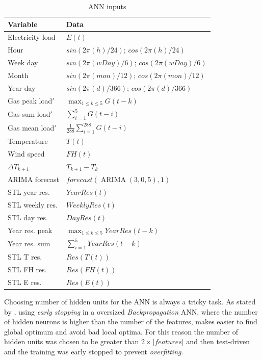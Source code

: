 \documentclass{sig-alternate-sigmod07}
\begin{document}
\begin{table}
\centering
\caption{ANN inputs}
\label{tab:ANNinputs}
\begin{tabular}{ll} \hline
Variable			& Data\\ \hline
Electricity load 		& $E(t)$ \\ 
Hour				& $sin(2\pi(h)/24)$; $cos(2\pi(h)/24)$\\
Week day			& $sin(2\pi(wDay)/6)$; $cos(2\pi(wDay)/6)$ \\
Month			& $sin(2\pi(mon)/12)$; $cos(2\pi(mon)/12)$ \\
Year day			& $sin(2\pi(d)/366)$; $cos(2\pi(d)/366)$ \\
Gas peak load$'$	& $\max_{1 \leq k \leq 5}G(t-k)$ \\
Gas sum load$'$	& $\sum_{i=1}^{5} G(t-i)$ \\
Gas mean load$'$	& $\frac{1}{288}\sum_{i=1}^{288} G(t-i)$ \\
Temperature		& $T(t)$ \\
Wind speed		& $FH(t)$ \\
$\Delta T_{k+1}$	& $T_{k+1} - T_{k}$ \\
ARIMA forecast		& $forecast(\operatorname{ARIMA} (3,0,5), 1)$ \\
STL year res.		& $YearRes(t)$ \\
STL weekly res.		& $WeeklyRes(t)$ \\
STL day res.		& $DayRes(t)$ \\
Year res. peak		& $\max_{1 \leq k \leq 5} YearRes(t-k) $ \\
Year res. sum		& $\sum_{i=1}^{5} YearRes(t-k)$ \\
STL T res.			& $Res(T(t))$ \\
STL FH res.		& $Res(FH(t))$ \\
STL E res.			& $Res(E(t))$ \\
\hline
\end{tabular}
\end{table}

Choosing number of hidden units for the ANN is always a tricky task. As stated by \cite{lawrence1998size, sarle1995stopped}, using \emph{early stopping} in a oversized \emph{Backpropagation} ANN, where the number of hidden neurons is higher than the number of the features, makes easier to find global optimum and avoid bad local optima. For this reason the number of hidden units was chosen to be greater than $2\times |features|$ and then test-driven and the training was early stopped to prevent \emph{overfitting}.
\end{document}
